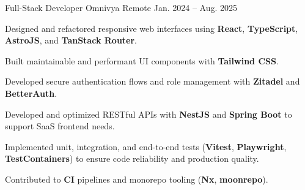 \begin{cventries}
  \cventry
  {Full-Stack Developer}
  {Omnivya}
  {Remote}
  {Jan. 2024 -- Aug. 2025}
  {
    \begin{cvitems}
      \item {Designed and refactored responsive web interfaces using \textbf{React}, \textbf{TypeScript}, \textbf{AstroJS}, and \textbf{TanStack Router}.}
      \item {Built maintainable and performant UI components with \textbf{Tailwind CSS}.}
      \item {Developed secure authentication flows and role management with \textbf{Zitadel} and \textbf{BetterAuth}.}
      \item {Developed and optimized RESTful APIs with \textbf{NestJS} and \textbf{Spring Boot} to support SaaS frontend needs.}
      \item {Implemented unit, integration, and end-to-end tests (\textbf{Vitest}, \textbf{Playwright}, \textbf{TestContainers}) to ensure code reliability and production quality.}
      \item {Contributed to \textbf{CI} pipelines and monorepo tooling (\textbf{Nx}, \textbf{moonrepo}).}
    \end{cvitems}
  }

\end{cventries}
